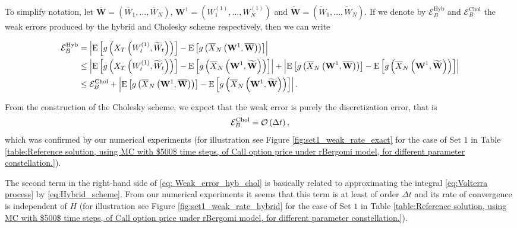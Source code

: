 To simplify notation, let  $\overline{\mathbf{W}}=(\overline{W}_1,\dots,\overline{W}_N)$, $\mathbf{W}^{1}=(W^{(1)}_1,\dots,W^{(1)}_N)$ and $\widetilde{\mathbf{W}}=(\widetilde{W}_1,\dots,\widetilde{W}_N)$. If we denote by $\mathcal{E}_{B}^{\text{Hyb}}$ and $\mathcal{E}_{B}^{\text{Chol}}$ the weak errors produced by the hybrid and Cholesky scheme respectively, then we can write
\begin{small}
\begin{align}\label{eq: Weak_error_hyb_chol}
\mathcal{E}_{B}^{\text{Hyb}}&=\left\lvert\mathrm{E}\left[g\left(X_T\left(W^{(1)}_t,\widetilde{W}_t\right) \right)\right]-\mathrm{E}\left[g\left(\overline{X}_N\left(\mathbf{W}^{1}, \overline{\mathbf{W}}\right) \right)\right]\right\rvert \nonumber\\
&\le \left\lvert\mathrm{E}\left[g\left(X_T\left(W^{(1)}_t,\widetilde{W}_t\right)\right)\right]-\mathrm{E}\left[g\left(\overline{X}_N\left(\mathbf{W}^{1}, \widetilde{\mathbf{W}}\right)\right)\right]\right\rvert+ \left\lvert \mathrm{E}\left[g\left(\overline{X}_N\left(\mathbf{W}^{1}, \overline{\mathbf{W}}\right)\right)\right]- \mathrm{E}\left[g\left(\overline{X}_N\left(\mathbf{W}^{1}, \widetilde{\mathbf{W}}\right)\right)\right]\right\rvert\nonumber\\
&\le \mathcal{E}_{B}^{\text{Chol}}+ \left\lvert \mathrm{E}\left[g\left(\overline{X}_N\left(\mathbf{W}^{1}, \overline{\mathbf{W}}\right)\right)\right]- \mathrm{E}\left[g\left(\overline{X}_N\left(\mathbf{W}^{1}, \widetilde{\mathbf{W}}\right)\right)\right]\right\rvert.
\end{align}
\end{small}
From the construction of the Cholesky scheme, we expect that the weak error is purely the discretization error, that is
\begin{align*}
\mathcal{E}_{B}^{\text{Chol}}={\mathcal{O}}\left(\Delta t\right),
\end{align*}
which was confirmed by our numerical experiments (for illustration see Figure \ref{fig:set1_weak_rate_exact} for the case of Set $1$  in Table \ref{table:Reference solution, using MC with $500$ time steps, of Call option price under rBergomi model, for different parameter constellation.}). 

The second term in the right-hand side of  \eqref{eq: Weak_error_hyb_chol} is basically related to approximating the integral \eqref{eq:Volterra process}  by \eqref{eq:Hybrid_scheme}. From our numerical experiments it seems that this term is  at least  of order  $\Delta t$  and its rate of convergence is independent of $H$ (for illustration see Figure \ref{fig:set1_weak_rate_hybrid} for the case of Set $1$  in Table \ref{table:Reference solution, using MC with $500$ time steps, of Call option price under rBergomi model, for different parameter constellation.}).


